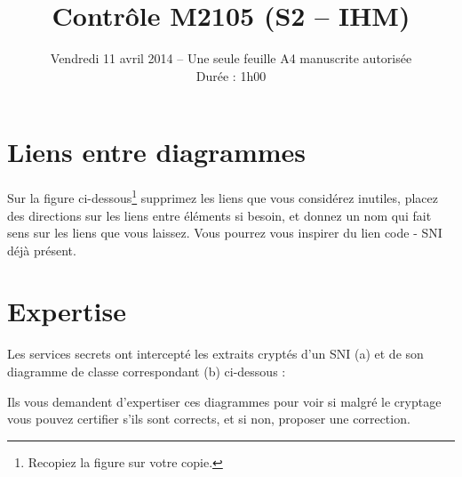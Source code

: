 \documentclass[12pt]{article}
\title{\vspace{-3pc}\textbf{Contr\^ole M2105 (S2 -- 	IHM)}}
\date{Vendredi 11 avril 2014 -- Une seule feuille A4 manuscrite autoris\'ee\\
Dur\'ee : 1h00}
\def\dc{\textsf{diagramme de classe}}
\def\sni{\textsf{SNI}}
\begin{document}
\maketitle

\section{Liens entre diagrammes}

Sur la figure ci-dessous\footnote{Recopiez la figure sur votre copie.} supprimez les liens que vous considérez inutiles, placez des directions sur les liens entre éléments si besoin, et donnez un nom qui fait sens sur les liens que vous laissez. Vous pourrez vous inspirer du lien \textsf{code} - \sni{} déjà présent.


\section{Expertise}

Les services secrets ont intercepté les extraits cryptés d'un \sni{} (a) et de son \dc{} correspondant (b) ci-dessous :


Ils vous demandent d'expertiser ces diagrammes pour voir si malgré le cryptage vous pouvez certifier s'ils sont corrects, et si non, proposer une correction.
\end{document}
